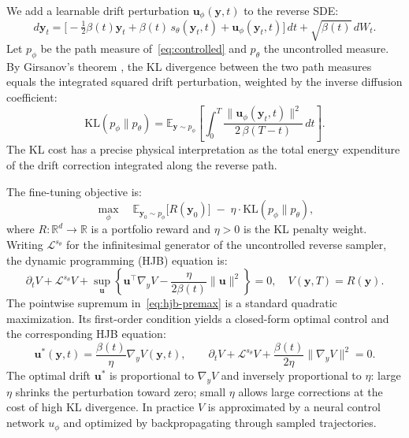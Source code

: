 \documentclass{article}
\newcommand{\R}{\mathbb{R}}
\newcommand{\E}{\mathbb{E}}
\newcommand{\KL}{\mathrm{KL}}
\newcommand{\bu}{\mathbf{u}}
\newcommand{\by}{\mathbf{y}}
\begin{document}
We add a learnable drift perturbation $\bu_\phi(\by,t)$ to the reverse SDE:
\begin{equation}
  d\by_t = \bigl[-\tfrac{1}{2}\beta(t) \by_t
    + \beta(t)\, s_\theta(\by_t,t) + \bu_\phi(\by_t,t)\bigr]\,dt
    + \sqrt{\beta(t)}\,dW_t.
  \label{eq:controlled}
\end{equation}
Let $p_\phi$ be the path measure of~\eqref{eq:controlled} and $p_\theta$ the
uncontrolled measure. By Girsanov's theorem \citep{oksendal2003stochastic}, the
KL divergence between the two path measures equals the integrated squared drift
perturbation, weighted by the inverse diffusion coefficient:
\begin{equation}
  \KL(p_\phi \| p_\theta)
  = \E_{\by\sim p_\phi}\!\left[
      \int_0^T \frac{\|\bu_\phi(\by_t,t)\|^2}{2\,\beta(T{-}t)}\,dt
    \right].
  \label{eq:kl-girsanov}
\end{equation}
The KL cost has a precise physical interpretation as the total energy expenditure
of the drift correction integrated along the reverse path.

The fine-tuning objective is:
\begin{equation}
  \max_{\phi}\quad
  \E_{\by_0\sim p_\phi}\!\bigl[R(\by_0)\bigr]
  \;-\; \eta\cdot\KL(p_\phi \| p_\theta),
  \label{eq:finetune-obj}
\end{equation}
where $R:\R^d\to\R$ is a portfolio reward and $\eta>0$ is the KL penalty weight.
Writing $\mathcal{L}^{s_\theta}$ for the infinitesimal generator of the
uncontrolled reverse sampler, the dynamic programming (HJB) equation is:
\begin{equation}
  \partial_t V + \mathcal{L}^{s_\theta}V
  + \sup_{\bu}\left\{\bu^\top\nabla_y V
     - \frac{\eta}{2\beta(t)}\|\bu\|^2\right\}=0,\quad
  V(\by,T)=R(\by).
  \label{eq:hjb-premax}
\end{equation}
The pointwise supremum in~\eqref{eq:hjb-premax} is a standard quadratic maximization.
Its first-order condition yields a closed-form optimal control and the corresponding
HJB equation:
\begin{equation}
  \bu^*(\by,t)=\frac{\beta(t)}{\eta}\nabla_y V(\by,t),
  \qquad
  \partial_t V+\mathcal{L}^{s_\theta}V
  +\frac{\beta(t)}{2\eta}\|\nabla_y V\|^2=0.
  \label{eq:hjb}
\end{equation}
The optimal drift $\bu^*$ is proportional to $\nabla_y V$ and inversely
proportional to $\eta$: large $\eta$ shrinks the perturbation toward zero;
small $\eta$ allows large corrections at the cost of high KL divergence.
In practice $V$ is approximated by a neural control network $u_\phi$ and
optimized by backpropagating through sampled trajectories.
\end{document}
